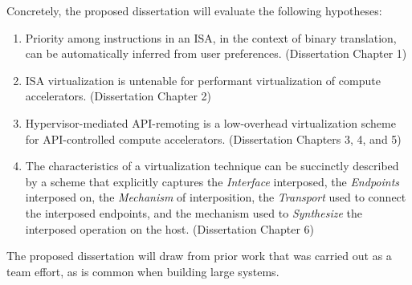 \noindent Concretely, the proposed dissertation will evaluate the following
hypotheses:
\begin{enumerate}[noitemsep, topsep=0pt, leftmargin=1em, labelwidth=*, align=left, label=\textbf{H \arabic*:}]
\item Priority among instructions in an ISA, in the context of binary
translation, can be automatically inferred from user preferences. (Dissertation Chapter 1)
\item ISA virtualization is untenable for performant virtualization of compute
accelerators. (Dissertation Chapter 2)
\item Hypervisor-mediated API-remoting is a low-overhead virtualization scheme
for API-controlled compute accelerators. (Dissertation Chapters 3, 4, and 5)
\item The characteristics of a virtualization technique can be succinctly
described by a scheme that explicitly captures the \textit{Interface}
interposed, the \textit{Endpoints} interposed on, the \textit{Mechanism} of
interposition, the \textit{Transport} used to connect the interposed
endpoints, and the mechanism used to \textit{Synthesize} the interposed
operation on the host. (Dissertation Chapter 6)
\end{enumerate}

The proposed dissertation will draw from prior work that was carried out as a
team effort, as is common when building large systems.